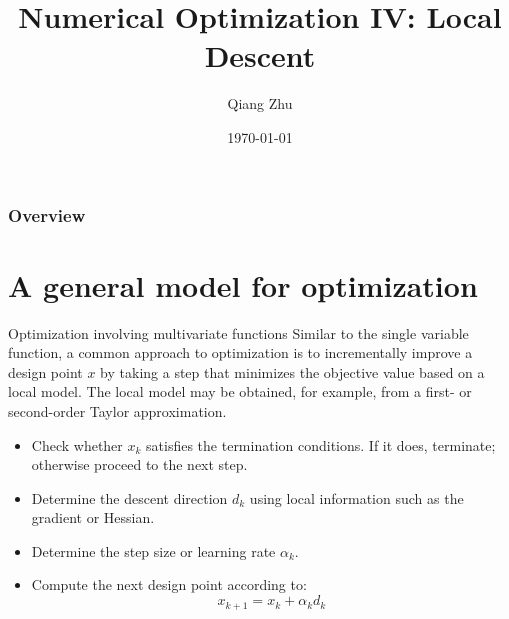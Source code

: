 \documentclass{beamer}
\title[Local Descent]{Numerical Optimization IV: Local Descent} %
\author{Qiang Zhu} %
\institute[University of Nevada Las Vegas] %
{
University of Nevada Las Vegas\\ %
\medskip
}
\date{\today} %
\begin{document}
\begin{frame}
\titlepage %
\end{frame}

\begin{frame}
\frametitle{Overview} %
\tableofcontents %
\end{frame}



\section{A general model for optimization}
\begin{frame}{Optimization involving multivariate functions}
Similar to the single variable function, a common approach to optimization is to incrementally improve a design point $x$ by taking a step that minimizes the objective value based on a local model. The local model may be obtained, for example, from a first- or second-order Taylor approximation.
\begin{itemize}
    \item Check whether $x_k$ satisfies the termination conditions. If it does, terminate; otherwise proceed to the next step.
    \item Determine the descent direction $d_k$ using local information such as the gradient or Hessian. 
    \item Determine the step size or learning rate $\alpha_k$.
    \item Compute the next design point according to:
    \begin{equation*}
        x_{k+1} = x_k + \alpha_k d_k
    \end{equation*}
\end{itemize}

\end{frame}
\end{document}
